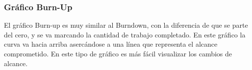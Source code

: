 \subsubsection{Gráfico Burn-Up}

El gráfico Burn-up es muy similar al Burndown, con la diferencia de que se parte del cero, y se va marcando la cantidad de trabajo completado. En este gráfico la curva va hacia arriba asercándose a una línea que representa el alcance comprometido. En este tipo de gráfico es más fácil visualizar los cambios de alcance.

